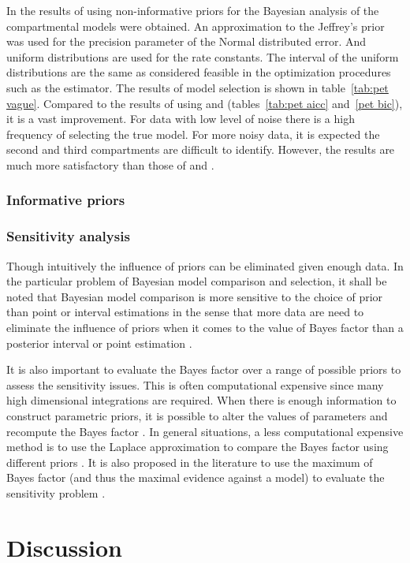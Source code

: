 In \cite{Zhou2013} the results of using non-informative priors for the
Bayesian analysis of the \pet compartmental models were obtained. An
approximation to the Jeffrey's prior was used for the precision parameter of
the Normal distributed error. And uniform distributions are used for the rate
constants. The interval of the uniform distributions are the same as
considered feasible in the optimization procedures such as the \nls estimator.
The results of model selection is shown in table~\ref{tab:pet vague}. Compared
to the results of using \aicc and \bic (tables~\ref{tab:pet aicc} and~\ref{pet
  bic}), it is a vast improvement. For data with low level of noise there is a
high frequency of selecting the true model. For more noisy data, it is
expected the second and third compartments are difficult to identify. However,
the results are much more satisfactory than those of \aicc and \bic.



\subsubsection{Informative priors}
\label{ssub:Informative priors}

\subsubsection{Sensitivity analysis}
\label{ssub:Sensitivity analysis}

Though intuitively the influence of priors can be eliminated given enough
data. In the particular problem of Bayesian model comparison and selection, it
shall be noted that Bayesian model comparison is more sensitive to the choice
of prior than point or interval estimations in the sense that more data are
need to eliminate the influence of priors when it comes to the value of Bayes
factor than a posterior interval or point estimation
\cite{Kass:1993vy,Kass:1995vb}.

It is also important to evaluate the Bayes factor over a range of possible
priors to assess the sensitivity issues. This is often computational expensive
since many high dimensional integrations are required. When there is enough
information to construct parametric priors, it is possible to alter the values
of parameters and recompute the Bayes factor \cite{McCulloch:1991hj}. In
general situations, a less computational expensive method is to use the
Laplace approximation to compare the Bayes factor using different priors
\cite{Kass:1992tz}. It is also proposed in the literature to use the maximum
of Bayes factor (and thus the maximal evidence against a model) to evaluate
the sensitivity problem \cite{Berger:1987iq}.

\section{Discussion}
\label{sec:Model Selection Discussion}
